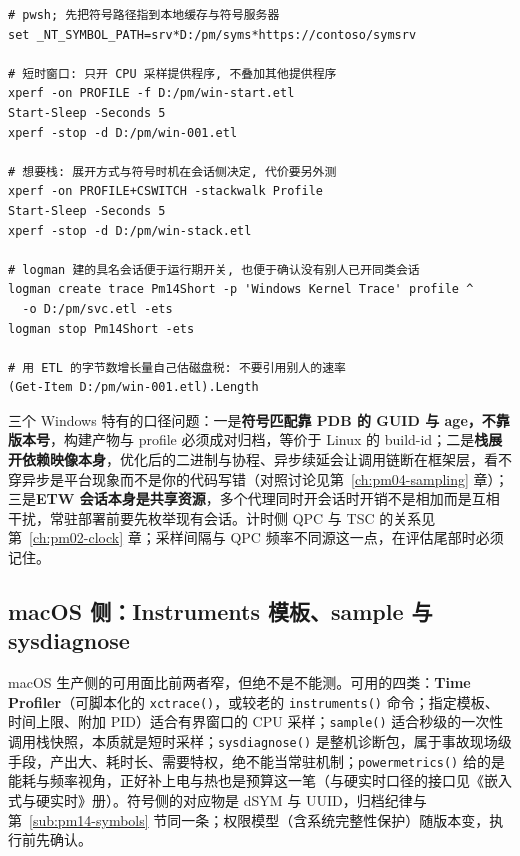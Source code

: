 \documentclass[12pt,a4paper,fontset=fandol]{ctexbook}
\newcommand{\Fn}[1]{\texttt{#1()}}
\begin{document}
\begin{lstlisting}[style=shellstyle, caption={Windows 低占空比采样骨架（形态示意：需管理员权限与会话权限；提供程序名与可用性请在自己的系统上确认）}, label={lst:pm14-win}]
# pwsh; 先把符号路径指到本地缓存与符号服务器
set _NT_SYMBOL_PATH=srv*D:/pm/syms*https://contoso/symsrv

# 短时窗口: 只开 CPU 采样提供程序, 不叠加其他提供程序
xperf -on PROFILE -f D:/pm/win-start.etl
Start-Sleep -Seconds 5
xperf -stop -d D:/pm/win-001.etl

# 想要栈: 展开方式与符号时机在会话侧决定, 代价要另外测
xperf -on PROFILE+CSWITCH -stackwalk Profile
Start-Sleep -Seconds 5
xperf -stop -d D:/pm/win-stack.etl

# logman 建的具名会话便于运行期开关, 也便于确认没有别人已开同类会话
logman create trace Pm14Short -p 'Windows Kernel Trace' profile ^
  -o D:/pm/svc.etl -ets
logman stop Pm14Short -ets

# 用 ETL 的字节数增长量自己估磁盘税: 不要引用别人的速率
(Get-Item D:/pm/win-001.etl).Length
\end{lstlisting}

三个 Windows 特有的口径问题：一是\textbf{符号匹配靠 PDB 的 GUID 与 age，不靠版本号}，构建产物与 profile 必须成对归档，等价于 Linux 的 build-id；二是\textbf{栈展开依赖映像本身}，优化后的二进制与协程、异步续延会让调用链断在框架层，看不穿异步是平台现象而不是你的代码写错（对照讨论见第~\ref{ch:pm04-sampling} 章）；三是\textbf{ETW 会话本身是共享资源}，多个代理同时开会话时开销不是相加而是互相干扰，常驻部署前要先枚举现有会话。计时侧 QPC 与 TSC 的关系见第~\ref{ch:pm02-clock} 章；采样间隔与 QPC 频率不同源这一点，在评估尾部时必须记住。

\subsection{macOS 侧：Instruments 模板、sample 与 sysdiagnose}
\label{sub:pm14-macos}

macOS 生产侧的可用面比前两者窄，但绝不是不能测。可用的四类：\textbf{Time Profiler}（可脚本化的 \Fn{xctrace}，或较老的 \Fn{instruments} 命令；指定模板、时间上限、附加 PID）适合有界窗口的 CPU 采样；\Fn{sample} 适合秒级的一次性调用栈快照，本质就是短时采样；\Fn{sysdiagnose} 是整机诊断包，属于事故现场级手段，产出大、耗时长、需要特权，绝不能当常驻机制；\Fn{powermetrics} 给的是能耗与频率视角，正好补上电与热也是预算这一笔（与硬实时口径的接口见《嵌入式与硬实时》册）。符号侧的对应物是 dSYM 与 UUID，归档纪律与第~\ref{sub:pm14-symbols} 节同一条；权限模型（含系统完整性保护）随版本变，执行前先确认。
\end{document}

